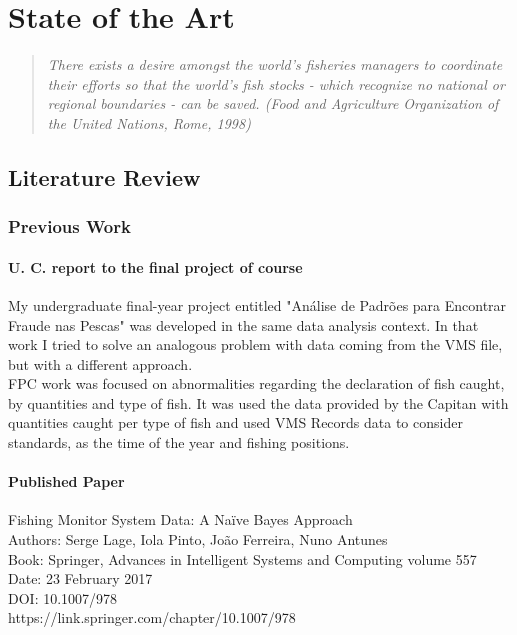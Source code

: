 

% 
% 
%
\chapter{State of the Art}
\label{cha:state_of_the_art}

\begin{quotation}
\textit{There exists a desire amongst the world's fisheries managers to coordinate their efforts so that the world's fish stocks - which recognize no national or regional boundaries - can be saved. \hfill (Food and Agriculture Organization of the United Nations, Rome, 1998)}
\end{quotation}

\section{Literature Review}
\label{sub:literature_review}


\subsection{Previous Work} %
\label{sec:previous_work}

\subsubsection{U. C. report to the final project of course} %
\label{sub:fpc}
My undergraduate final-year project entitled "Análise de Padrões para Encontrar Fraude nas Pescas" was developed in the same data analysis context. In that work I tried to solve an analogous problem with data coming from the VMS file, but with a different approach.\\
FPC work was focused on abnormalities regarding the declaration of fish caught, by quantities and type of fish. It was used the data provided by the Capitan with quantities caught per type of fish and used VMS Records data to consider standards, as the time of the year and fishing positions.


\subsubsection{Published Paper} %
\label{sub:published_paper}
Fishing Monitor System Data: A Naïve Bayes Approach\\
Authors: Serge Lage, Iola Pinto, João Ferreira, Nuno Antunes\\
Book: Springer, Advances in Intelligent Systems and Computing volume 557\\
Date: 23 February 2017\\
DOI: 10.1007/978\\
https://link.springer.com/chapter/10.1007/978\\


